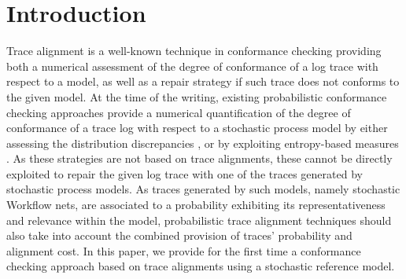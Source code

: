 
\section{Introduction}
\label{introduction}
Trace alignment is a well-known technique in conformance checking \cite{DBLP:conf/edoc/AdriansyahDA11} providing both a numerical assessment of the degree of conformance of a log trace with respect to a model, as well as a repair strategy if such trace does not conforms to the given model. At the time of the writing, 
%
existing probabilistic conformance checking approaches %
provide a numerical quantification of the degree of conformance
of a trace log with respect to a stochastic process model \cite{DBLP:journals/tosem/PolyvyanyySWCM20}
by either assessing the distribution discrepancies \cite{DBLP:conf/bpm/LeemansSA19}, or by exploiting entropy-based measures \cite{DBLP:conf/icpm/PolyvyanyyK19}. As these strategies are not based on trace alignments, these cannot be directly exploited to repair the given log trace with one of the traces generated by stochastic process models. As traces generated by such models, namely  stochastic Workflow nets, are associated to a probability exhibiting its representativeness and relevance  within the model, probabilistic trace alignment techniques should also take into account the combined provision of traces' probability and alignment cost.
In this paper, we provide for the first time a conformance checking approach based on trace alignments using a stochastic reference
model.


